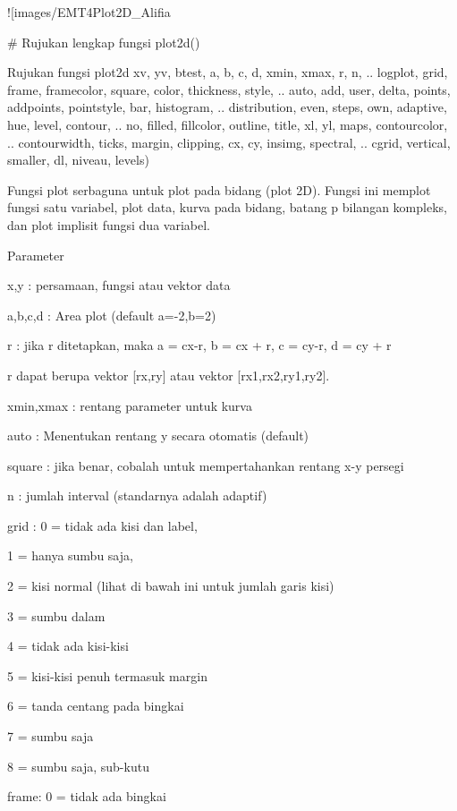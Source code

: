 \documentclass{article}
\begin{document}
![images/EMT4Plot2D_Alifia%

# Rujukan lengkap fungsi plot2d()

Rujukan fungsi plot2d xv, yv, btest, a, b, c, d, xmin, xmax, r, n, ..
logplot, grid, frame, framecolor, square, color, thickness, style, ..
auto, add, user, delta, points, addpoints, pointstyle, bar, histogram,
.. distribution, even, steps, own, adaptive, hue, level, contour, ..
no, filled, fillcolor, outline, title, xl, yl, maps, contourcolor, ..
contourwidth, ticks, margin, clipping, cx, cy, insimg, spectral, ..
cgrid, vertical, smaller, dl, niveau, levels)


Fungsi plot serbaguna untuk plot pada bidang (plot 2D). Fungsi ini
memplot fungsi satu variabel, plot data, kurva pada bidang, batang p
bilangan kompleks, dan plot implisit fungsi dua variabel.


Parameter


x,y : persamaan, fungsi atau vektor data


a,b,c,d : Area plot (default a=-2,b=2)


r : jika r ditetapkan, maka a = cx-r, b = cx + r, c = cy-r, d = cy + r


            r dapat berupa vektor [rx,ry] atau vektor
[rx1,rx2,ry1,ry2].


xmin,xmax : rentang parameter untuk kurva


auto : Menentukan rentang y secara otomatis (default)


square : jika benar, cobalah untuk mempertahankan rentang x-y persegi


n : jumlah interval (standarnya adalah adaptif)


grid : 0 = tidak ada kisi dan label,


            1 = hanya sumbu saja,


            2 = kisi normal (lihat di bawah ini untuk jumlah garis
kisi)


            3 = sumbu dalam


            4 = tidak ada kisi-kisi


            5 = kisi-kisi penuh termasuk margin


            6 = tanda centang pada bingkai


            7 = sumbu saja


            8 = sumbu saja, sub-kutu


frame: 0 = tidak ada bingkai
\end{document}
